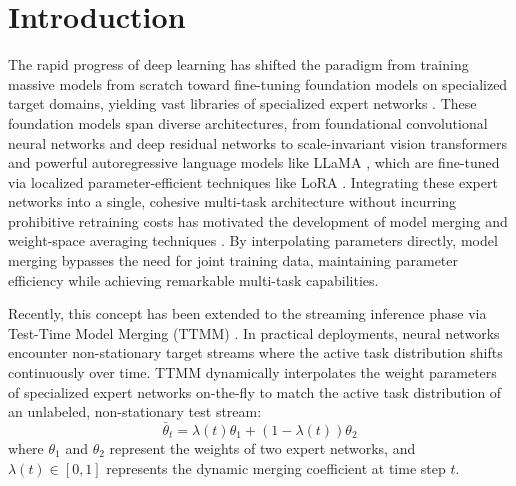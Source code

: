 \documentclass{article}
\theoremstyle{plain}
\theoremstyle{definition}
\theoremstyle{remark}
\begin{document}
\section{Introduction}
\label{sec:intro}
The rapid progress of deep learning has shifted the paradigm from training massive models from scratch toward fine-tuning foundation models on specialized target domains, yielding vast libraries of specialized expert networks \cite{wortsman2022model, radford2021learning}. These foundation models span diverse architectures, from foundational convolutional neural networks \cite{krizhevsky2012imagenet, simonyan2014very, szegedy2016rethinking} and deep residual networks \cite{he2016deep} to scale-invariant vision transformers \cite{dosovitskiy2020image, vaswani2017attention} and powerful autoregressive language models like LLaMA \cite{touvron2023llama}, which are fine-tuned via localized parameter-efficient techniques like LoRA \cite{hu2021lora}. Integrating these expert networks into a single, cohesive multi-task architecture without incurring prohibitive retraining costs has motivated the development of model merging and weight-space averaging techniques \cite{ilharco2022editing, yadav2023ties, yu2023dare, jin2023regmean, ainsworth2022git, shao2023federated}. By interpolating parameters directly, model merging bypasses the need for joint training data, maintaining parameter efficiency while achieving remarkable multi-task capabilities.

Recently, this concept has been extended to the streaming inference phase via Test-Time Model Merging (TTMM) \cite{yang2024test, hubotter2025coacting}. In practical deployments, neural networks encounter non-stationary target streams where the active task distribution shifts continuously over time. TTMM dynamically interpolates the weight parameters of specialized expert networks on-the-fly to match the active task distribution of an unlabeled, non-stationary test stream:
\begin{equation}
\bar{\theta}_t = \lambda(t)\theta_1 + (1 - \lambda(t))\theta_2
\end{equation}
where $\theta_1$ and $\theta_2$ represent the weights of two expert networks, and $\lambda(t) \in [0, 1]$ represents the dynamic merging coefficient at time step $t$.
\end{document}
